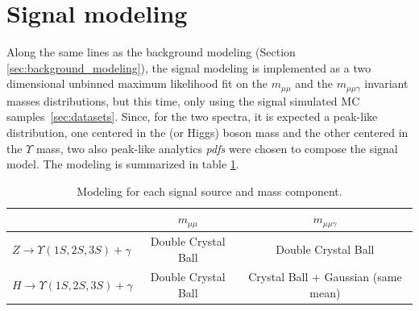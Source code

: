 \clearpage
\section{Signal modeling}

Along the same lines as the background modeling (Section \ref{sec:background_modeling}), the signal modeling is implemented as a two dimensional unbinned maximum likelihood fit on the $m_{\mu\mu}$ and the $m_{\mu\mu\gamma}$ invariant masses distributions, but this time, only using the signal simulated MC samples~\ref{sec:datasets}. Since, for the two spectra, it is expected a peak-like distribution, one centered in the \Z (or Higgs) boson mass and the other centered in the $\Upsilon$ mass, two also peak-like analytics \textit{pdfs} were chosen to compose the signal model. The modeling is summarized in table \ref{tab:SignalModeling}.





\begin{table}[ht]
\begin{center}
\caption{Modeling for each signal source and mass component.}
\begin{tabular}{l|c|c}
                         & \boldmath$m_{\mu\mu}$                                          & \boldmath$m_{\mu\mu\gamma}$       \\ \hline 
\textbf{\boldmath$Z \rightarrow \Upsilon(1S,2S,3S) +\gamma$}       & Double Crystal Ball & Double Crystal Ball      \\ \hline
\textbf{\boldmath$H \rightarrow \Upsilon(1S,2S,3S) +\gamma$} & Double Crystal Ball & Crystal Ball + Gaussian (same mean)  \\ 
\end{tabular}

\label{tab:SignalModeling}
\end{center}
\end{table}




